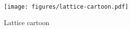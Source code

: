 \begin{figure}[ht]
  \centering
  \texttt{[image: figures/lattice-cartoon.pdf]}
  \caption{Lattice cartoon}
  \label{fig:lattice-cartoon}
\end{figure}
